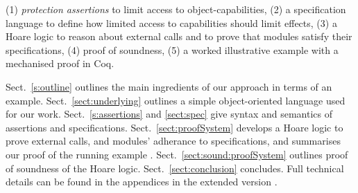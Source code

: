  

 
(1) \emph{protection assertions} to limit access to object-capabilities, %
(2) a specification language to define how limited access to capabilities should limit effects, %
(3) a Hoare logic to reason about external calls and to prove that modules satisfy their %
specifications,
(4) proof of soundness,
(5) a worked illustrative example {with a mechanised proof in Coq}.
 

Sect.\ \ref{s:outline}   outlines the main ingredients of our approach in terms of an {example}.
Sect.\ \ref{sect:underlying} outlines a simple object-oriented language used for our work. 
Sect.\ \ref{s:assertions} and 
\ref{sect:spec}  give syntax and semantics of assertions  and  specifications.
Sect.\ \ref{sect:proofSystem} develops a Hoare logic  
 to prove external calls, and modules' adherance to  specifications, and summarises our  proof
  of  the running example 
 { . }
Sect.\ \ref{sect:sound:proofSystem} outlines %
proof of soundness of
the Hoare logic. 
 Sect.\ \ref{sect:conclusion} concludes. %
Full  technical details can be found in the appendices %
{in the extended version \cite{externalCallsFull}.}

